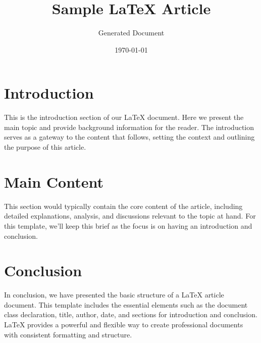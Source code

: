 \documentclass{article}
\title{Sample LaTeX Article}
\author{Generated Document}
\date{\today}
\begin{document}
\maketitle

\section{Introduction}
This is the introduction section of our LaTeX document. Here we present the main topic and provide background information for the reader. The introduction serves as a gateway to the content that follows, setting the context and outlining the purpose of this article.

\section{Main Content}
This section would typically contain the core content of the article, including detailed explanations, analysis, and discussions relevant to the topic at hand. For this template, we'll keep this brief as the focus is on having an introduction and conclusion.

\section{Conclusion}
In conclusion, we have presented the basic structure of a LaTeX article document. This template includes the essential elements such as the document class declaration, title, author, date, and sections for introduction and conclusion. LaTeX provides a powerful and flexible way to create professional documents with consistent formatting and structure.
\end{document}
